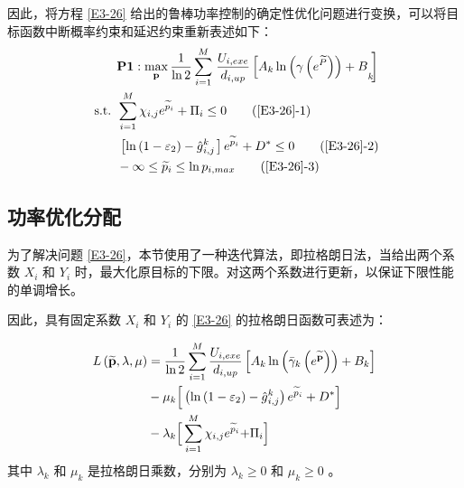 因此，将方程 \eqref{E3-26} 给出的鲁棒功率控制的确定性优化问题进行变换，可以将目标函数中断概率约束和延迟约束重新表述如下：
\begin{align}
&\textbf{P1}:\max\limits_{\mathbf{p}}\frac{1}{\ln{2}}\sum_{i=1}^{M}\left.\frac{U_{i,exe}}{d_{i,up}}
\left[{A_k\ln{\left(\gamma\left(e^{\widetilde{P}}\right)\right)}+B}_k\!\!\right.\right]                         \label{E3-26}\\
\text { s.t. }
& \sum_{i=1}^{M}{\chi_{i,j}e^{{\widetilde{p}}_i}}+\mathrm{\Pi}_i\le0                                           \tag{\ref{E3-26}{-1}}      \label{E3-26-1}\\  %
& \left.\left[\ln\left(1-\varepsilon_2\right)-{\hat{g}}\phantom{}_{i,j}^k\right.\right]e^{{\widetilde{p}}_i}+D^\ast\le0  \tag{\ref{E3-26}{-2}}      \label{E3-26-2}\\  %
& -\infty\le{\widetilde{p}}_i\le \ln{p_{i,max}}                                                                \tag{\ref{E3-26}{-3}}      \label{E3-26-3}  %
\end{align}
\subsection{功率优化分配}\label{section3-3-3}
为了解决问题 \eqref{E3-26}，本节使用了一种迭代算法，即拉格朗日法，当给出两个系数 $X_i$ 和 $Y_i$ 时，最大化原目标的下限。对这两个系数进行更新，以保证下限性能的单调增长。

因此，具有固定系数 $X_i$ 和 $Y_i$ 的 \eqref{E3-26} 的拉格朗日函数可表述为：

\begin{align}\label{E27}
L\left(\widetilde{\mathbf{p}},\lambda,\mu\right)&=\frac{1}{\ln{2}}\sum_{i=1}^{M}{\frac{U_{i,exe}}{d_{i,up}}\left[A_k\ln{\left({\bar{\gamma}}_k\left(e^{\widetilde{\mathbf{p}}}\right)\right)}+B_k\right]}\\
&\notag-\mu_k\Big[\left(\ln\left(1-\varepsilon_2\right)-{\hat{g}}\phantom{}_{i,j}^k\right)e^{{\widetilde{p}}_i}+D^\ast\Big]\\
&-\lambda_k\Big[\sum_{i=1}^{M}{\chi_{i,j}e^{{\widetilde{p}}_i}}{+\mathrm{\Pi}}_i\Big]\notag
\end{align}
其中 $\lambda_k$ 和 $\mu_k$ 是拉格朗日乘数，分别为 $\lambda_k\geq0$ 和 $\mu_k\geq0$ 。


